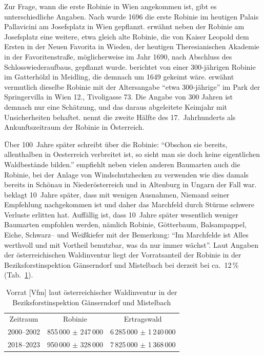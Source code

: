 \documentclass[twocolumn]{scrartcl}
\begin{document}
Zur Frage, wann die erste Robinie in Wien angekommen ist, gibt es
unterschiedliche Angaben. Nach \citet[S.~147]{loudon1838arboretum1}
wurde 1696 die erste Robinie im heutigen Palais Pallavicini am
Josefsplatz in Wien
gepflanzt. \citet[S.~15--16]{jacquin1825univGarten} erwähnt neben der
Robinie am Josefsplatz eine weitere, etwa gleich alte Robinie, die von
Kaiser Leopold dem Ersten in der Neuen Favorita in Wieden, der
heutigen Theresianischen Akademie in der Favoritenstraße,
möglicherweise im Jahr 1690, nach Abschluss des Schlosswiederaufbaus,
gepflanzt wurde. \citet{jagr1949robinie} berichtet von einer
300-jährigen Robinie im Gatterhölzl in Meidling, die demnach um 1649
gekeimt wäre. \citet{anonymNatLand1949robinie} erwähnt vermutlich
dieselbe Robinie mit der Altersangabe \enquote{etwa 300-jährige} im
Park der Springervilla in Wien 12., Tivoligasse 73. Die Angabe von 300
Jahren ist demnach nur eine Schätzung, und das daraus abgeleitete
Keimjahr mit Unsicherheiten behaftet. \citet[S.~1395]{hegi1924band43}
nennt die zweite Hälfte des 17.~Jahrhunderts als Ankunftszeitraum der
Robinie in Österreich.

Über 100~Jahre später schreibt
\citet[S.~339]{Feistmantel1835dieForstwissenschaft} über die Robinie:
\enquote{Obschon sie bereits, allenthalben in Oesterreich verbreitet
  ist, so sieht man sie doch keine eigentlichen Waldbestände bilden.}
\citet{hofmann1851baumloseEbenen} empfiehlt neben vielen anderen
Baumarten auch die Robinie, bei der Anlage von Windschutzhecken zu
verwenden wie dies damals bereits in Schönau in Niederösterreich und
in Altenburg in Ungarn der Fall war.
\citet{hofmann1861waldbaumCulturWarchfelde} beklagt 10~Jahre später,
dass mit wenigen Ausnahmen, Niemand seiner Empfehlung nachgekommen ist
und daher das Marchfeld durch Stürme schwere Verluste erlitten hat.
Auffällig ist, dass 10~Jahre später wesentlich weniger Baumarten
empfohlen werden, nämlich Robinie, Götterbaum, Balsampappel, Eiche,
Schwarz-- und Weißkiefer mit der Bemerkung: \enquote{Im Marchfelde ist
  Alles werthvoll und mit Vortheil benutzbar, was da nur immer
  wächst}.
Laut Angaben der österreichischen Waldinventur
\citep{bfw2025waldinventurWeb} liegt der Vorratsanteil der Robinie in
der Beziksforstinspektion Gänserndorf und Mistelbach bei derzeit bei
ca.\ 12\,\% (Tab.~\ref{tab:waldinventur}).

\begin{table}[htbp]
  \centering
\begin{tabular}{ccc}
Zeitraum   & Robinie  & Ertragswald \\
2000--2002  & 855\,000 $\pm$ 247\,000 & 6\,285\,000 $\pm$ 1\,240\,000 \\
2018--2023  & 950\,000 $\pm$ 328\,000 & 7\,825\,000 $\pm$ 1\,368\,000 
  \end{tabular}
  \caption{Vorrat [Vfm] laut österreichischer Waldinventur \citep{bfw2025waldinventurWeb} in der Beziksforstinspektion Gänserndorf und Mistelbach}
  \label{tab:waldinventur}
\end{table}
\end{document}
